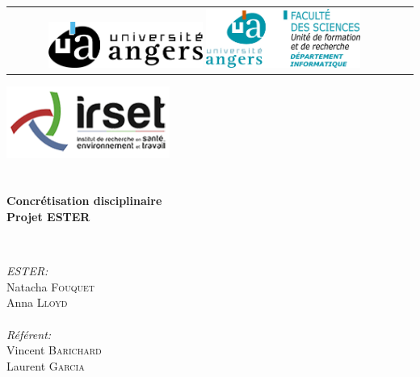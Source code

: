
\begin{titlepage}
    \begin{center}
    
    
    \begin{tabular}{cc}
  \includegraphics[width=0.4\textwidth]{./img/ua_h_couleur}
  \hspace{4cm}
    \includegraphics[width=0.4\textwidth]{./img/Dpt_Info}
	\end{tabular}    
    
      \vspace{1cm}

	
	\includegraphics[width=0.4\textwidth]{./img/irset}~\\[1cm]

    
    \textsc{\Large }\\[0.5cm]
    
    \HRule \\[0.4cm]
    
    {\huge \bfseries Concrétisation disciplinaire\\
   Projet ESTER \\[0.4cm] }
    
    \HRule \\[1.5cm]
    
    \begin{minipage}{0.4\textwidth}
    \begin{flushleft} \large
    
     \emph{ESTER:}\\
    Natacha \textsc{Fouquet}\\
    Anna \textsc{Lloyd}\\
    \textsc{\Large }\\[0.3cm]
    \emph{Référent:}\\
    Vincent \textsc{Barichard}\\
    Laurent \textsc{Garcia}
    

\end{flushleft}
\end{minipage}
\end{center}
\end{titlepage}

